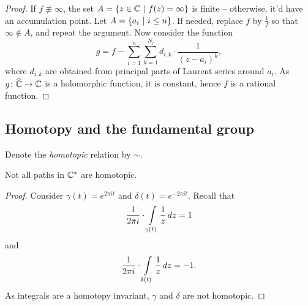 \begin{proof}
If $f \not \equiv \infty$, the set
$A = \left\{z \in \mathbb{C}~\middle\vert~f(z) = \infty\right\}$ is finite -- otherwise, it'd
have an accumulation point. Let $A = \left\{a_i~\middle\vert~i \leq n\right\}$. If
needed, replace $f$ by $\frac{1}{f}$ so that $\infty \not \in A$,
and repeat the argument. Now consider the function
\[
g =
f - \sum_{i=1}^n \sum_{k=1}^{N_i}
d_{i,k} \cdot \frac{1}{(z - a_i)^k},
\]
where $d_{i,k}$ are obtained from principal parts of Laurent series
around $a_i$. As $g \colon \widehat{\mathbb{C}} \to \mathbb{C}$ is a holomorphic function,
it is constant, hence $f$ is a rational function.
\end{proof}

\newpage

\subsection{Homotopy and the fundamental group}

\begin{definicija}
Denote the \emph{homotopic} relation by $\sim$.
\end{definicija}

\begin{trditev}
Not all paths in $\mathbb{C}^*$ are homotopic.
\end{trditev}

\begin{proof}
Consider $\gamma(t) = e^{2 \pi i t}$ and
$\delta(t) = e^{-2 \pi i t}$. Recall that
\[
\frac{1}{2 \pi i} \cdot \int\limits_{\gamma(t)} \frac{1}{z}\,dz = 1
\]
and
\[
\frac{1}{2 \pi i} \cdot \int\limits_{\delta(t)} \frac{1}{z}\,dz = -1.
\]
As integrals are a homotopy invariant, $\gamma$ and $\delta$ are
not homotopic.
\end{proof}
